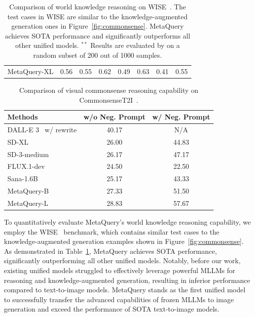 \documentclass[]{fairmeta}
\newcommand\our{{\fontfamily{lmtt}\selectfont MetaQuery}\xspace}
\begin{document}
\begin{table}[!t]
\begin{tabular}{lccccccc}
    \our-XL & \cellcolor{green!10}0.56& 0.55 &\cellcolor{green!10}0.62 &  \cellcolor{green!10}0.49 &  \cellcolor{green!10}0.63 & 0.41 & \cellcolor{green!10}0.55 \\
    \end{tabular}
    \caption{Comparison of world knowledge reasoning on WISE~\citep{wise}. The test cases in WISE are similar to the knowledge-augmented generation ones in Figure~\ref{fig:commonsense}. \our achieves SOTA performance and significantly outperforms all other unified models. $^{**}$ Results are evaluated by \citet{gpt-imgeval} on a random subset of 200 out of 1000 samples.}
    \label{tab:wisescore}
\end{table}

\begin{table}[!t]
    \small
    \centering
    \begin{tabular}{lcc}
        \textbf{Methods} & \textbf{w/o Neg. Prompt} & \textbf{w/ Neg. Prompt} \\
        \midrule
 DALL-E 3~\citep{dalle} w/ rewrite & \cellcolor{green!10}40.17 & N/A \\
 SD-XL~\citep{sdxl} & 26.00 & 44.83 \\
 SD-3-medium~\citep{sd3} & 26.17 & 47.17 \\
 FLUX.1-dev~\citep{flux} & 24.50 & 22.50 \\
 Sana-1.6B~\citep{sana} & 25.17 & 43.33 \\
        \our-B & 27.33 & 51.50 \\
        \our-L & 28.83 & \cellcolor{green!10}57.67 \\
        
    \end{tabular}
    \caption{Comparison of visual commonsense reasoning capability on CommonsenseT2I~\citep{commonsenset2i}.}
    \label{tab:commonsenset2i}
\end{table}


To quantitatively evaluate \our's world knowledge reasoning capability, we employ the WISE~\citep{wise} benchmark, which contains similar test cases to the knowledge-augmented generation examples shown in Figure~\ref{fig:commonsense}. As demonstrated in Table~\ref{tab:wisescore}, \our achieves SOTA performance, significantly outperforming all other unified models. Notably, before our work, existing unified models struggled to effectively leverage powerful MLLMs for reasoning and knowledge-augmented generation, resulting in inferior performance compared to text-to-image models. \our stands as the first unified model to successfully transfer the advanced capabilities of frozen MLLMs to image generation and exceed the performance of SOTA text-to-image models.
\end{document}
